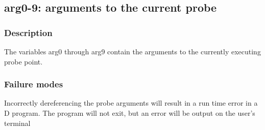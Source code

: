 \clearpage
{}
{}
\label{vars:arg09}
\subsection*{arg0-9: arguments to the current probe}

\subsubsection*{Description}

The variables arg0 through arg9 contain the arguments to the currently
executing probe point.

\subsubsection*{Failure modes}

Incorrectly dereferencing the probe arguments will result in a run
time error in a D program.  The program will not exit, but an error
will be output on the user's terminal
